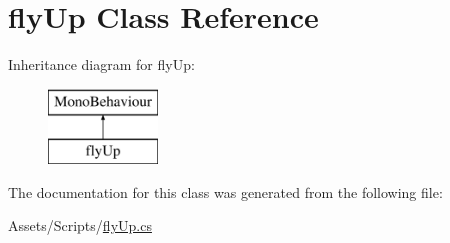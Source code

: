 \hypertarget{classfly_up}{}\section{fly\+Up Class Reference}
\label{classfly_up}
Inheritance diagram for fly\+Up\+:\begin{figure}[H]
\begin{center}
\leavevmode
\includegraphics[height=2.000000cm]{classfly_up}
\end{center}
\end{figure}


The documentation for this class was generated from the following file\+:\begin{DoxyCompactItemize}
\item 
Assets/\+Scripts/\mbox{\hyperlink{fly_up_8cs}{fly\+Up.\+cs}}\end{DoxyCompactItemize}
